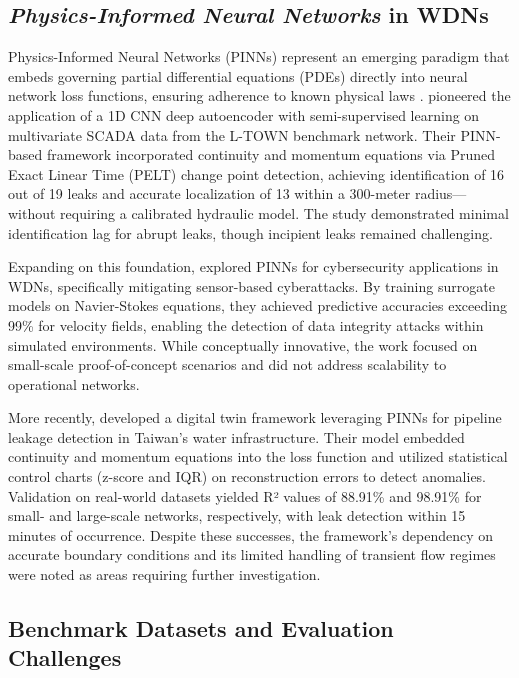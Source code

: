 \documentclass[final,5p,times,twocolumn,authoryear]{elsarticle}
\begin{document}
\subsection{\emph{Physics-Informed Neural Networks} in WDNs}

Physics-Informed Neural Networks (PINNs) represent an emerging paradigm that embeds governing partial differential equations (PDEs) directly into neural network loss functions, ensuring adherence to known physical laws \cite{RAISSI2019686}. \cite{TORNYEVIADZI2023106062} pioneered the application of a 1D CNN deep autoencoder with semi-supervised learning on multivariate SCADA data from the L-TOWN benchmark network. Their PINN-based framework incorporated continuity and momentum equations via Pruned Exact Linear Time (PELT) change point detection, achieving identification of 16 out of 19 leaks and accurate localization of 13 within a 300-meter radius—without requiring a calibrated hydraulic model. The study demonstrated minimal identification lag for abrupt leaks, though incipient leaks remained challenging.

Expanding on this foundation, \cite{falas2020pinnwatersecurity} explored PINNs for cybersecurity applications in WDNs, specifically mitigating sensor-based cyberattacks. By training surrogate models on Navier-Stokes equations, they achieved predictive accuracies exceeding 99\% for velocity fields, enabling the detection of data integrity attacks within simulated environments. While conceptually innovative, the work focused on small-scale proof-of-concept scenarios and did not address scalability to operational networks.

More recently, \cite{lin2025digitaltwin} developed a digital twin framework leveraging PINNs for pipeline leakage detection in Taiwan's water infrastructure. Their model embedded continuity and momentum equations into the loss function and utilized statistical control charts (z-score and IQR) on reconstruction errors to detect anomalies. Validation on real-world datasets yielded R² values of 88.91\% and 98.91\% for small- and large-scale networks, respectively, with leak detection within 15 minutes of occurrence. Despite these successes, the framework's dependency on accurate boundary conditions and its limited handling of transient flow regimes were noted as areas requiring further investigation.



\subsection{Benchmark Datasets and Evaluation Challenges}
\end{document}
